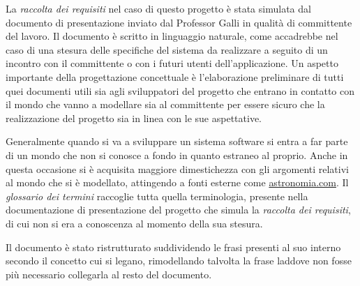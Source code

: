 \documentclass[12pt,a4paper,onecolumn,x11names]{article}
\begin{document}
	La \textit{raccolta dei requisiti} nel caso di questo progetto è stata simulata dal documento di presentazione inviato dal Professor Galli in qualità di committente del lavoro. Il documento è scritto in linguaggio naturale, come accadrebbe nel caso di una stesura delle  specifiche del sistema da realizzare a seguito di un incontro con il committente o con i futuri utenti dell'applicazione.
	Un aspetto importante della progettazione concettuale è l'elaborazione preliminare di tutti quei documenti utili sia agli sviluppatori del progetto che entrano in contatto con il mondo che vanno a modellare sia al committente per essere sicuro che la realizzazione del progetto sia in linea con le sue aspettative. 
	\newline

	Generalmente quando si va a sviluppare un sistema software si entra a far parte di un mondo che non si conosce a fondo in quanto estraneo al proprio. Anche in questa occasione si è acquisita maggiore dimestichezza con gli argomenti relativi al mondo che si è modellato, attingendo a fonti esterne come \textsf{\href{http://www.astronomia.com}{astronomia.com}}. Il \textit{glossario dei termini} raccoglie tutta quella terminologia, presente nella documentazione di presentazione del progetto che simula la \textit{raccolta dei requisiti}, di cui non si era a conoscenza al momento della sua stesura.\newline
	
	Il documento è stato ristrutturato suddividendo le frasi presenti al suo interno secondo il concetto cui si legano, rimodellando talvolta la frase laddove non fosse più necessario collegarla al resto del documento.
\end{document}
